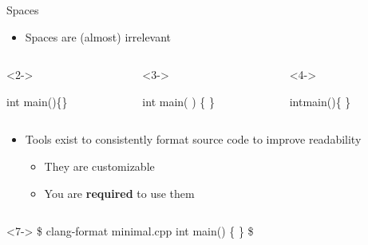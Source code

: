 \begin{frame}[fragile]{Spaces}

  \begin{itemize}
  \item Spaces are (almost) irrelevant
  \end{itemize}

  \begin{columns}[T]
  \begin{column}{.3\textwidth}<2->
    \begin{codeblock}
int main()\{\}

\end{codeblock}
  \end{column}

  \begin{column}{.3\textwidth}<3->
    \begin{codeblock}
int
main(  ) \{
   \}\end{codeblock}
  \end{column}

  \begin{column}{.3\textwidth}<4->
    \begin{codeblock}
intmain()\{ \}

    \end{codeblock}
  \end{column}


\end{columns}

\begin{itemize}[<6->]
\item Tools exist to consistently format source code to improve readability
  \begin{itemize}
  \item They are customizable
  \item You are \textbf{required} to use them
  \end{itemize}
\end{itemize}

\begin{columns}[T]
  \begin{column}{.4\textwidth}
    \begin{shellblock}<7->{
\$ clang-format minimal.cpp
int main()
\{
\}
\$}\end{shellblock}
  \end{column}


\end{columns}
\end{frame}
